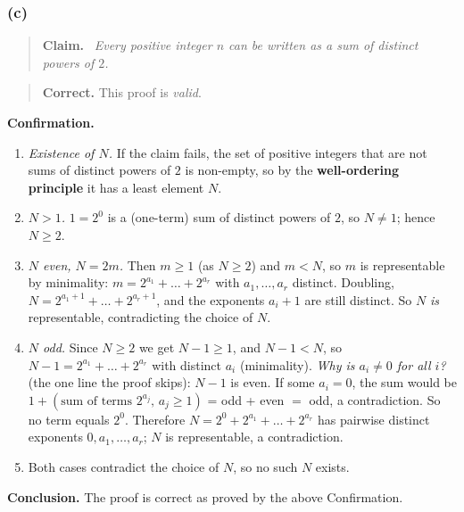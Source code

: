 \documentclass[11pt,a4paper]{article}
\newcommand{\cmark}{\checkmark}
\newenvironment{claimbox}[1][]{\par\smallskip\begin{quote}\textbf{#1.}\ \itshape}{\end{quote}}
\newenvironment{verdictbox}[2][]{\par\begin{quote}}{\end{quote}}
\theoremstyle{definition}
\newcommand{\goodmark}{\textbf{Correct.}}
\begin{document}
\subsubsection*{(c)}
\begin{claimbox}[Claim]
Every positive integer $n$ can be written as a sum of distinct powers of $2$.
\end{claimbox}

\begin{verdictbox}{okgreen}
\goodmark{} This proof is \emph{valid}.
\end{verdictbox}



\textbf{Confirmation.}
\begin{enumerate}
  \item \emph{Existence of $N$.} If the claim fails, the set of positive integers that are not sums of distinct 
  powers of $2$ is non-empty, so by the \textbf{well-ordering principle} 
  it has a least element $N$. \cmark
  \item \emph{$N>1$.} $1=2^0$ is a (one-term) sum of distinct powers of $2$, 
  so $N\neq1$; hence $N\ge2$. \cmark
  \item \emph{$N$ even, $N=2m$.} Then $m\ge1$ (as $N\ge2$) and $m<N$, so $m$ is 
  representable by minimality:
        $m=2^{a_1}+\dots+2^{a_r}$ with $a_1,\dots,a_r$ distinct. 
        Doubling, $N=2^{a_1+1}+\dots+2^{a_r+1}$, and the exponents
        $a_i+1$ are still distinct. So $N$ \emph{is} representable, 
        contradicting the choice of $N$. \cmark
  \item \emph{$N$ odd.} Since $N\ge2$ we get $N-1\ge1$, and $N-1<N$, so $N-1=2^{a_1}+\dots+2^{a_r}$ with distinct $a_i$ (minimality).
        \emph{Why is $a_i\ne0$ for all $i$?} (the one line the proof skips): $N-1$ is even. If some $a_i=0$, the sum would be
        $1+(\text{sum of terms }2^{a_j},\,a_j\ge1)$ = odd + even $=$ odd, a contradiction. So no term equals $2^0$.
        Therefore $N=2^0+2^{a_1}+\dots+2^{a_r}$ has pairwise distinct exponents $0,a_1,\dots,a_r$; $N$ is representable, a contradiction. \cmark
  \item Both cases contradict the choice of $N$, so no such $N$ exists. \cmark
\end{enumerate}

\textbf{Conclusion.} The proof is correct as proved by the above Confirmation.
\end{document}

